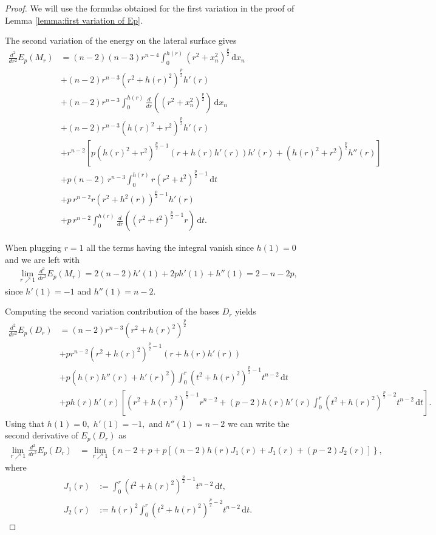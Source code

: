 \documentclass[10pt,a4paper]{amsart}
\newcommand{\dd}{\, \mathrm{d}}
\begin{document}
\begin{proof} We will use the formulas obtained for the first variation in the proof of Lemma \ref{lemma:first variation of Ep}.

The second variation of the energy on the lateral surface gives
\begin{align*}
    \frac{d^2}{dr^2}E_p(M_r) &= (n-2)(n-3)r^{n-4}\int_0^{h(r)}(r^2+x_n^2)^{\frac{p}{2}}\dd x_n  \\
    &+(n-2)r^{n-3}(r^2+h(r)^2)^{\frac{p}{2}}  h'(r)  \\
    &+(n-2)r^{n-3} \int_0^{h(r)}\frac{d}{dr} \left((r^2+x_n^2)^{\frac{p}{2}} \right)\dd x_n  \\
    &+ (n-2)r^{n-3}(h(r)^2+r^2)^{\frac{p}{2}}h'(r)  \\
    &+ r^{n-2}\left[p(h(r)^2+r^2)^{\frac{p}{2}-1} \left( r+h(r)h'(r)\right)h'(r) +(h(r)^2+r^2)^{\frac{p}{2}}h''(r) \right] \\
    &+  p (n-2)\,  r^{n-3} \int_{0}^{h(r)}  r \left( r^2 + t^2 \right)^{\frac{p}{2}-1} \dd t \\
    &+  p \,  r^{n-2} r\left( r^2 + h^2(r)\right)^{\frac{p}{2}-1}h'(r) \\
    &+ p \, r^{n-2} \int_0^{h(r)} \frac{d}{dr} \left( (r^2 +t^2)^{\frac{p}{2}-1} r \right) \dd t.
\end{align*}

When plugging $r=1$ all the terms having the integral vanish since $h(1)=0$ and we are left with
\begin{align}\label{EpMr double prime}
   \lim_{r\nearrow 1}  \frac{d^2}{dr^2}E_p(M_r) = 2(n-2)h'(1) + 2p h'(1) +h''(1)   =  2-n-2p,
\end{align}
since $h'(1)=-1$ and $h''(1)=n-2$.

Computing the second variation contribution of the bases $D_r$ yields
\begin{align*}
    \frac{d^2}{dr^2}E_p(D_r)&= (n-2) r^{n-3} \left(r^2 +h(r)^2 \right)^{\frac{p}{2}}   \\
    &+ p r^{n-2} \left(r^2 +h(r)^2 \right)^{\frac{p}{2}-1} \left(r+h(r)h'(r) \right)   \\
    &+ p   \left( h(r)h''(r)+h'(r)^2\right) \int_0^r  \left( t^2 +h(r)^2 \right)^{\frac{p}{2}-1} t^{n-2} \dd t  \\
    &+ph(r)h'(r) \left[ \left(r^2+h(r)^2 \right)^{\frac{p}{2}-1} r^{n-2} + (p-2) h(r)h'(r)\int_{0}^{r} \left( t^2 +h(r)^2 \right)^{\frac{p}{2}-2} t^{n-2} \dd t\right].
\end{align*}
Using that $h(1)=0,$ $h'(1)=-1,$ and $h''(1)=n-2$ we can write the second derivative of $E_p(D_r)$ as
\begin{align}\label{EpDr double prime with limit}
    \lim_{r\nearrow 1}\frac{d^2}{dr^2}E_p(D_r) &= \lim_{r\nearrow 1} \left\{ n-2 + p+p [(n-2)h(r)J_1(r)+J_1(r) + (p-2)J_2(r)]\right\},  
     \end{align}
where
\begin{align*}
    J_1(r)&:= \int_0^r  \left( t^2 +h(r)^2 \right)^{\frac{p}{2}-1} t^{n-2} \dd t, \\
    J_2(r)&:= h(r)^2 \int_{0}^{r} \left( t^2 +h(r)^2 \right)^{\frac{p}{2}-2} t^{n-2} \dd t.
\end{align*}



\end{proof}
\end{document}
